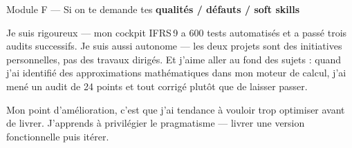 \documentclass[11pt,a4paper]{article}
\begin{document}
\vspace{6pt}

\begin{modulebox}{Module F --- Si on te demande tes \textbf{qualit\'es / d\'efauts / soft skills}}

\begin{verbatimbox}
\og Je suis rigoureux --- mon cockpit IFRS\,9 a 600 tests automatis\'es
et a pass\'e trois audits successifs. Je suis aussi autonome --- les deux
projets sont des initiatives personnelles, pas des travaux dirig\'es.
Et j'aime aller au fond des sujets : quand j'ai identifi\'e des
approximations math\'ematiques dans mon moteur de calcul, j'ai men\'e
un audit de 24 points et tout corrig\'e plut\^ot que de laisser passer.

Mon point d'am\'elioration, c'est que j'ai tendance \`a vouloir trop
optimiser avant de livrer. J'apprends \`a privil\'egier le pragmatisme
--- livrer une version fonctionnelle puis it\'erer. \fg{}
\end{verbatimbox}
\end{modulebox}

\vspace{6pt}
\end{document}
